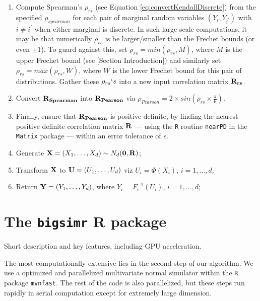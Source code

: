 \documentclass[
]{article}
\providecommand{\tightlist}{%
  \setlength{\itemsep}{0pt}\setlength{\parskip}{0pt}}
\begin{document}
\begin{enumerate}
\def\labelenumi{(\roman{enumi})}
\tightlist
\item
  Compute Spearman's \(\rho_{rs}\) (see Equation
  \eqref{eq:convertKendallDiscrete}) from the specified \(\rho_{spearman}\) for each
  pair of marginal random variables \((Y_i,Y_{i^\prime})\) with \(i \neq i^\prime\)
  when either marginal is discrete. In such large scale computations, it may be
  that numerically \(\rho_{rs}\) is be larger/smaller than the Frechet bounds (or
  even \(\pm 1\)). To guard against this, set \(\rho_{rs} = min( \rho_{rs}, M)\),
  where \(M\) is the upper Frechet bound (see {[}Section Introduction{]}) and similarly set \(\rho_{rs} = max( \rho_{rs}, W)\), where \(W\) is the lower Frechet bound for this pair of distributions. Gather these \(\rho_{rs} \lq s\) into a new input correlation matrix \({\bf R_{rs}}\).\\
\item
  Convert \({\bf R_{Spearman}}\) into \({\bf R_{Pearson}}\) via \(\rho_{Pearson} = 2 \times sin \left( \rho_{rs} \times \frac{\pi}{6} \right)\).\\
\item
  Finally, ensure that \({\bf R_{Pearson}}\) is positive definite, by finding the nearest positive definite correlation matrix \({\bf R}\) --- using the \texttt{R} routine \texttt{nearPD} in the \texttt{Matrix} package --- within an error tolerance of \(\epsilon\).\\
\item
  Generate \({\bf X}=(X_1, \ldots, X_d) \sim N_d({\bf 0}, {\bf R})\);\\
\item
  Transform \({\bf X}\) to \({\bf U} = (U_1, \ldots, U_d)\) viz \(U_i=\Phi(X_i)\), \(i=1, \ldots, d\);\\
\item
  Return \({\bf Y} = (Y_1, \ldots, Y_d)\), where \(Y_i=F_i^{-1}(U_i)\), \(i=1, \ldots, d\);
\end{enumerate}

\hypertarget{the-bigsimr-r-package}{%
\section{\texorpdfstring{The \texttt{bigsimr} R package}{The bigsimr R package}}\label{the-bigsimr-r-package}}

Short description and key features, including GPU acceleration.

The most computationally extensive lies in the second step of our algorithm. We
use a optimized and parallelized multivariate normal simulator within the \texttt{R}
package \texttt{mvnfast}. The rest of the code is also parallelized, but these steps
run rapidly in serial computation except for extremely large dimension.
\end{document}
